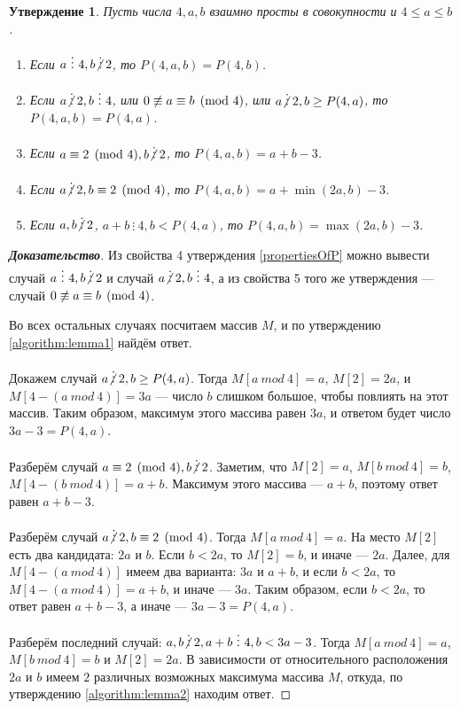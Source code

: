 \documentclass[12pt]{article}
\newtheorem{proposition}[theorem]{Утверждение}
\theoremstyle{definition}
\begin{document}
\begin{proposition}
Пусть числа $4, a, b$ взаимно просты в совокупности и $4 \le a \le b$.
\begin{enumerate}
	\item Если $a \ \vdots \ 4, b \centernot \vdots 2$, то $P(4, a, b) = P(4, b)$.

	\item Если $a \centernot \vdots 2, b \ \vdots \ 4$, или $0 \centernot \equiv a \equiv b \pmod 4$, или $a \centernot\vdots 2, b \ge P(4, a)$, то $P(4, a, b) = P(4, a)$.
	
	\item Если $a \equiv 2 \pmod 4, b \centernot \vdots 2$, то $P(4, a, b) = a + b - 3$.
		
	\item Если $a \centernot\vdots 2, b \equiv 2 \pmod 4$, то $P(4, a, b)= a + \min(2a, b) - 3$.

	\item Если $a, b \centernot \vdots 2$, $a + b \ \vdots \ 4, b < P(4, a)$, то $P(4, a, b) = \max(2a, b) - 3$. 
\end{enumerate}
\end{proposition}
\begin{proof}[\textbf{Доказательство}]
Из свойства 4 утверждения \ref{propertiesOfP} можно вывести случай $a \ \vdots \ 4, b \centernot \vdots 2$ и случай $a \centernot \vdots 2, b \ \vdots \ 4$, а из свойства 5 того же утверждения --- случай $0 \centernot \equiv a \equiv b \pmod 4$.

Во всех остальных случаях посчитаем массив $M$, и по утверждению \ref{algorithm:lemma1} найдём ответ.

Докажем случай $a \centernot\vdots 2, b \ge P(4, a)$. Тогда $M[a \ mod \ 4] = a$, $M[2] = 2a$, и $M[4 - (a \ mod \ 4)] = 3a$ --- число $b$ слишком большое, чтобы повлиять на этот массив. Таким образом, максимум этого массива равен $3a$, и ответом будет число $3a - 3 = P(4, a)$.

Разберём случай $a \equiv 2 \pmod 4, b \centernot\vdots 2$. Заметим, что $M[2] = a$, $M[b \ mod \ 4] = b$, $M[4 - (b \ mod \ 4)] = a + b$. Максимум этого массива --- $a + b$, поэтому ответ равен $a + b - 3$.

Разберём случай $a \centernot\vdots 2, b \equiv 2 \pmod 4$. Тогда $M[a \ mod \ 4] = a$. На место $M[2]$ есть два кандидата: $2a$ и $b$. Если $b < 2a$, то $M[2] = b$, и иначе --- $2a$. Далее, для $M[4 - (a \ mod \ 4)]$ имеем два варианта: $3a$ и $a + b$, и если $b < 2a$, то $M[4 - (a \ mod \ 4)] = a + b$, и иначе --- $3a$. Таким образом, если $b < 2a$, то ответ равен $a + b - 3$, а иначе --- $3a - 3 = P(4, a)$.

Разберём последний случай: $a, b \centernot \vdots 2, a + b \ \vdots \ 4, b < 3a - 3$. Тогда $M[a \ mod \ 4] = a$, $M[b \ mod \ 4] = b$ и $M[2] = 2a$. В зависимости от относительного расположения $2a$ и $b$ имеем $2$ различных возможных максимума массива $M$, откуда, по утверждению \ref{algorithm:lemma2} находим ответ.
\end{proof}
\end{document}
